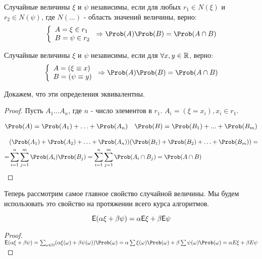 \begin{definition}
    Случайные величины $\xi$ и $\psi$ независимы, если для любых $r_1 \in N(\xi)$ и $r_2 \in N(\psi)$, где $N(\ldots)$ - область значений величины, верно:
    \[
        \left \lbrace
        \begin{array}{l}
            A = \xi \in r_1\\
            B = \psi \in r_2
        \end{array}
        \right.
        \Rightarrow \P(A)\P(B) = \P(A \cap B)
    \]
\end{definition}

\begin{definition}
    Случайные величины $\xi$ и $\psi$ независимы, если для $\forall x,y \in \mathbb{R}$, верно:
    \[
        \left \lbrace
        \begin{array}{l}
            A = (\xi \equiv x) \\
            B = (\psi \equiv y)
        \end{array}
        \right.
        \Rightarrow \P(A)\P(B) = \P(A \cap B)
    \]
\end{definition}

Докажем, что эти определения эквивалентны.
\begin{proof}
    Пусть $A_1 \ldots A_n$, где $n$ - число элементов в $r_1$. $A_i = (\xi = x_i), x_i \in r_1$. \par
    \begin{align*}
        & \P(A) = \P(A_1)+ \ldots +\P(A_n)
        & \P(B) = \P(B_1)+...+\P(B_m)
    \end{align*}

    \begin{align}
          & (\P(A_1) + \P(A_2) + \ldots + \P(A_n))(\P(B_1) + \P(B_2) + \ldots + \P(B_m)) = \\
        = & \sum_{i=1}^{n}\sum_{j=1}^{m}\P(A_i)\P(B_j) = \sum_{i=1}^{n}\sum_{j=1}^{m}\P(A_i \cap B_j) = \P(A \cap B)
    \end{align}
\end{proof}

Теперь рассмотрим самое главное свойство случайной величины. Мы будем использовать это свойство на протяжении всего курса алгоритмов. \par

\begin{theorem}
\[
    \mathsf{E}(\alpha\xi + \beta\psi) = \alpha \mathsf{E}\xi + \beta \mathsf{E}\psi
\]
\end{theorem}

\begin{proof}
    $\E(\alpha\xi + \beta\psi) = \sum_{\omega \in \Omega}(\alpha\xi(\omega) + \beta\psi(\omega))\P(\omega)
    = \alpha \sum \xi(\omega)\P(\omega) + \beta \sum \psi(\omega)\P(\omega)
    = \alpha E\xi + \beta E\psi$
\end{proof}

